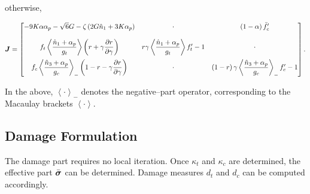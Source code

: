 otherwise,
\begin{footnotesize}
\begin{gather}
\bm{J}=\begin{bmatrix}
-9K\alpha\alpha_p-\sqrt{6}G-\zeta\left(2G\hat{n}_1+3K\alpha_p\right)&\cdot&\left(1-\alpha\right)\bar{f}_c'\\[4mm]
f_t\left\langle\dfrac{\hat{n}_1+\alpha_p}{g_t}\right\rangle\left(r+\gamma\dfrac{\partial{r}}{\partial{\gamma}}\right)&r\gamma\left\langle\dfrac{\hat{n}_1+\alpha_p}{g_t}\right\rangle{}f_t'-1&\cdot\\[4mm]
f_c\left\langle\dfrac{\hat{n}_3+\alpha_p}{g_c}\right\rangle_-\left(1-r-\gamma\dfrac{\partial{r}}{\partial{\gamma}}\right)&\cdot&\left(1-r\right)\gamma\left\langle\dfrac{\hat{n}_3+\alpha_p}{g_c}\right\rangle_-f_c'-1
\end{bmatrix}.
\end{gather}
\end{footnotesize}
In the above, $\left\langle\cdot\right\rangle_-$ denotes the negative--part operator, corresponding to the Macaulay brackets $\left\langle\cdot\right\rangle$.
\subsection{Damage Formulation}
The damage part requires no local iteration.
Once $\kappa_t$ and $\kappa_c$ are determined, the effective part $\bar{\bm{\sigma}}$ can be determined.
Damage measures $d_t$ and $d_c$ can be computed accordingly.
